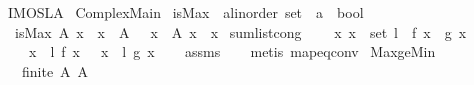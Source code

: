 %
\begin{isabellebody}%
%
%
\isadelimdocument
%
\endisadelimdocument
%
\isatagdocument
%
\isamarkuptrue%
%
\endisatagdocument
{\isafolddocument}%
%
\isadelimdocument
%
\endisadelimdocument
%
\isadelimtheory
%
\endisadelimtheory
%
\isatagtheory
{}\isamarkupfalse%
\ IMO{\isacharunderscore}{}{}{}{}{\isacharunderscore}SL{\isacharunderscore}A{}\isanewline
{}\ Complex{\isacharunderscore}Main\isanewline
{}%
\endisatagtheory
{\isafoldtheory}%
%
\isadelimtheory
\isanewline
%
\endisadelimtheory
\isanewline
{}\isamarkupfalse%
\ is{\isacharunderscore}Max\ {\isacharcolon}{\isacharcolon}\ {\isachardoublequoteopen}{\isacharprime}a{\isacharcolon}{\isacharcolon}linorder\ set\ {\isasymRightarrow}\ {\isacharprime}a\ {\isasymRightarrow}\ bool{\isachardoublequoteclose}\ \isanewline
\ \ {\isachardoublequoteopen}is{\isacharunderscore}Max\ A\ x\ {\isasymlongleftrightarrow}\ x\ {\isasymin}\ A\ {\isasymand}\ {\isacharparenleft}{\isasymforall}\ x{\isacharprime}\ {\isasymin}\ A{\isachardot}\ x{\isacharprime}\ {\isasymle}\ x{\isacharparenright}{\isachardoublequoteclose}\isanewline
\isanewline
{}\isamarkupfalse%
\ sum{\isacharunderscore}list{\isacharunderscore}cong{\isacharcolon}\isanewline
\ \ \ {\isachardoublequoteopen}{\isasymAnd}\ x{\isachardot}\ x\ {\isasymin}\ set\ l\ {\isasymLongrightarrow}\ f\ x\ {\isacharequal}\ g\ x{\isachardoublequoteclose}\isanewline
\ \ \ {\isachardoublequoteopen}{\isacharparenleft}{\isasymSum}\ x\ {\isasymleftarrow}\ l{\isachardot}\ f\ x{\isacharparenright}\ {\isacharequal}\ {\isacharparenleft}{\isasymSum}\ x\ {\isasymleftarrow}\ l{\isachardot}\ g\ x{\isacharparenright}{\isachardoublequoteclose}\isanewline
%
\isadelimproof
\ \ %
\endisadelimproof
%
\isatagproof
{}\isamarkupfalse%
\ assms\isanewline
\ \ \isamarkupfalse%
\ {\isacharparenleft}metis\ map{\isacharunderscore}eq{\isacharunderscore}conv{\isacharparenright}%
\endisatagproof
{\isafoldproof}%
%
\isadelimproof
\isanewline
%
\endisadelimproof
\isanewline
{}\isamarkupfalse%
\ Max{\isacharunderscore}ge{\isacharunderscore}Min{\isacharcolon}\isanewline
\ \ \ {\isachardoublequoteopen}finite\ A{\isachardoublequoteclose}\ {\isachardoublequoteopen}A\ {\isasymnoteq}\ {\isacharbraceleft}{\isacharbraceright}{\isachardoublequoteclose}\isanewline

\end{isabellebody}
